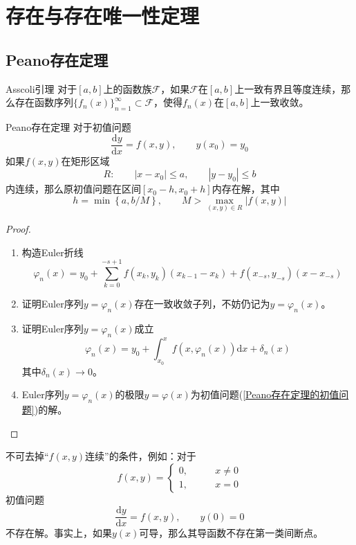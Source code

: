 \documentclass[lang = cn, scheme = chinese, thmcnt = section]{elegantbook}
\newcommand{\sub}{\subset}             %
\newcommand{\dd}{\mathrm{d}}           %
\begin{document}
\section{存在与存在唯一性定理}

\subsection{Peano存在定理}

\begin{theorem}{Asscoli引理}
	对于$[a,b]$上的函数族$\mathscr{F}$，如果$\mathscr{F}$在$[a,b]$上一致有界且等度连续，那么存在函数序列$\{f_n(x)\}_{n=1}^{\infty}\sub\mathscr{F}$，使得$f_n(x)$在$[a,b]$上一致收敛。
\end{theorem}

\begin{theorem}{Peano存在定理}
	对于初值问题
	\begin{equation*}
		\frac{\dd y}{\dd x}=f(x,y),\qquad 
		y(x_0)=y_0
		\label{Peano存在定理的初值问题}
		\tag{*}
	\end{equation*}
	如果$f(x,y)$在矩形区域
	$$
	R:\qquad 
	|x-x_0|\le a,\qquad 
	|y-y_0|\le b
	$$
	内连续，那么原初值问题在区间$[x_0-h,x_0+h]$内存在解，其中
	$$
	h=\min{\left\{a,b/M\right\}},\qquad 
	M>\max_{(x,y)\in{R}}{|f(x,y)|}
	$$
\end{theorem}

\begin{proof}
	\begin{enumerate}
		\item 构造Euler折线%
		$$
		\varphi_n(x)=y_0+\sum_{k=0}^{-s+1}f(x_k,y_k)(x_{k-1}-x_k)+f(x_{-s},y_{-s})(x-x_{-s})
		$$
		\item 证明Euler序列$y=\varphi_n(x)$存在一致收敛子列，不妨仍记为$y=\varphi_n(x)$。
		\item 证明Euler序列$y=\varphi_n(x)$成立%
		$$
		\varphi_n(x)=y_0+\int_{x_0}^{x}f(x,\varphi_n(x))\dd x+\delta_n(x)
		$$
		其中$\delta_n(x)\to 0$。
		\item Euler序列$y=\varphi_n(x)$的极限$y=\varphi(x)$为初值问题(\ref{Peano存在定理的初值问题})的解。
	\end{enumerate}
\end{proof}

\begin{note}
	不可去掉“$f(x,y)$连续”的条件，例如：对于
	$$
	f(x,y)=\begin{cases}
		0,\qquad & x\ne 0\\
		1,\qquad & x=0
	\end{cases}
	$$
	初值问题
	$$
	\frac{\dd y}{\dd x}=f(x,y),\qquad 
	y(0)=0
	$$
	不存在解。事实上，如果$y(x)$可导，那么其导函数不存在第一类间断点。
\end{note}
\end{document}
